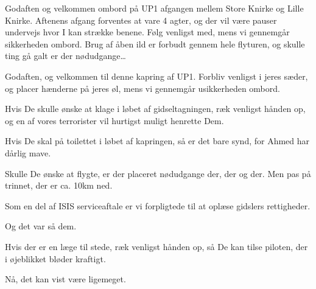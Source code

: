 \documentclass[a4paper,11pt]{article}
\begin{document}
\begin{sketch}



 Godaften og velkommen ombord på UP1 afgangen mellem Store Knirke og Lille Knirke.
Aftenens afgang forventes at vare 4 agter, og der vil være pauser undervejs hvor I kan strække benene.
Følg venligst med, mens vi gennemgår sikkerheden ombord.
Brug af åben ild er forbudt gennem hele flyturen, og skulle ting gå galt er der nødudgange\ldots



 Godaften, og velkommen til denne kapring af UP1. Forbliv venligst i jeres sæder,
og placer hænderne på jeres øl, mens vi gennemgår usikkerheden ombord.


 Hvis De skulle ønske at klage i løbet af gidseltagningen, ræk venligst
hånden op, og en af vores terrorister vil hurtigst muligt henrette Dem.


 Hvis De skal på toilettet i løbet af kapringen, så er det bare synd,
          for Ahmed har dårlig mave.

 Skulle De ønske at flygte, er der placeret nødudgange der, der og der.
Men pas på trinnet, der er ca. 10km ned.

 Som en del af ISIS serviceaftale er vi forpligtede til at oplæse gidslers
rettigheder.


 Og det var så dem.


 Hvis der er en læge til stede, ræk venligst hånden op, så De kan
tilse piloten, der i øjeblikket bløder kraftigt.


 Nå, det kan vist være ligemeget.


\end{sketch}
\end{document}
